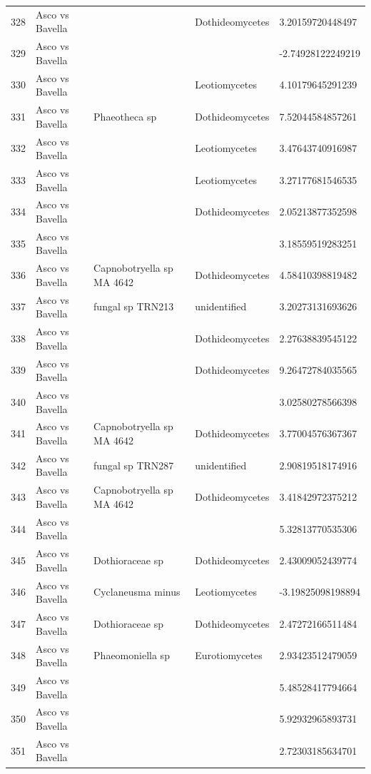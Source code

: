 \documentclass[12pt]{article}\usepackage[]{graphicx}\usepackage[]{color}
\numberwithin{figure}{section}
\begin{document}
\begin{table}[ht]
\begin{tabular}{lllll}
  328 & Asco vs Bavella &  & Dothideomycetes & 3.20159720448497 \\ 
  329 & Asco vs Bavella &  &  & -2.74928122249219 \\ 
  330 & Asco vs Bavella &  & Leotiomycetes & 4.10179645291239 \\ 
  331 & Asco vs Bavella & Phaeotheca sp & Dothideomycetes & 7.52044584857261 \\ 
  332 & Asco vs Bavella &  & Leotiomycetes & 3.47643740916987 \\ 
  333 & Asco vs Bavella &  & Leotiomycetes & 3.27177681546535 \\ 
  334 & Asco vs Bavella &  & Dothideomycetes & 2.05213877352598 \\ 
  335 & Asco vs Bavella &  &  & 3.18559519283251 \\ 
  336 & Asco vs Bavella & Capnobotryella sp MA 4642 & Dothideomycetes & 4.58410398819482 \\ 
  337 & Asco vs Bavella & fungal sp TRN213 & unidentified & 3.20273131693626 \\ 
  338 & Asco vs Bavella &  & Dothideomycetes & 2.27638839545122 \\ 
  339 & Asco vs Bavella &  & Dothideomycetes & 9.26472784035565 \\ 
  340 & Asco vs Bavella &  &  & 3.02580278566398 \\ 
  341 & Asco vs Bavella & Capnobotryella sp MA 4642 & Dothideomycetes & 3.77004576367367 \\ 
  342 & Asco vs Bavella & fungal sp TRN287 & unidentified & 2.90819518174916 \\ 
  343 & Asco vs Bavella & Capnobotryella sp MA 4642 & Dothideomycetes & 3.41842972375212 \\ 
  344 & Asco vs Bavella &  &  & 5.32813770535306 \\ 
  345 & Asco vs Bavella & Dothioraceae sp & Dothideomycetes & 2.43009052439774 \\ 
  346 & Asco vs Bavella & Cyclaneusma minus & Leotiomycetes & -3.19825098198894 \\ 
  347 & Asco vs Bavella & Dothioraceae sp & Dothideomycetes & 2.47272166511484 \\ 
  348 & Asco vs Bavella & Phaeomoniella sp & Eurotiomycetes & 2.93423512479059 \\ 
  349 & Asco vs Bavella &  &  & 5.48528417794664 \\ 
  350 & Asco vs Bavella &  &  & 5.92932965893731 \\ 
  351 & Asco vs Bavella &  &  & 2.72303185634701 \\ 

\end{tabular}
\end{table}
\end{document}
